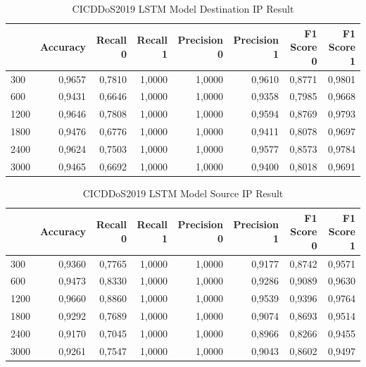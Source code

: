 \documentclass{article}
\begin{document}
\begin{table}
  \centering
  \caption{CICDDoS2019 LSTM Model Destination IP Result}
  \label{cicddos2019-lstm-dst-ip-best}
  \begin{tabular}{lrrrrrrr}
    \toprule
	{Pred Win & Accuracy & Recall 0 & Recall 1 & Precision 0 & Precision 1 & F1 Score 0 & F1 Score 1} \\
	\midrule
        300 & 0,9657 & 0,7810 & 1,0000 & 1,0000 & 0,9610 & 0,8771 & 0,9801 \\ \hline
        600 & 0,9431 & 0,6646 & 1,0000 & 1,0000 & 0,9358 & 0,7985 & 0,9668 \\ \hline
        1200 & 0,9646 & 0,7808 & 1,0000 & 1,0000 & 0,9594 & 0,8769 & 0,9793 \\ \hline
        1800 & 0,9476 & 0,6776 & 1,0000 & 1,0000 & 0,9411 & 0,8078 & 0,9697 \\ \hline
        2400 & 0,9624 & 0,7503 & 1,0000 & 1,0000 & 0,9577 & 0,8573 & 0,9784 \\ \hline
        3000 & 0,9465 & 0,6692 & 1,0000 & 1,0000 & 0,9400 & 0,8018 & 0,9691 \\ 
	\bottomrule
  \end{tabular}
\end{table}

\begin{table}
  \centering
  \caption{CICDDoS2019 LSTM Model Source IP Result}
  \label{cicddos2019-lstm-src-ip-best}
  \begin{tabular}{lrrrrrrr}
    \toprule
	{Pred Win & Accuracy & Recall 0 & Recall 1 & Precision 0 & Precision 1 & F1 Score 0 & F1 Score 1} \\
	\midrule
        300 & 0,9360 & 0,7765 & 1,0000 & 1,0000 & 0,9177 & 0,8742 & 0,9571 \\ \hline
        600 & 0,9473 & 0,8330 & 1,0000 & 1,0000 & 0,9286 & 0,9089 & 0,9630 \\ \hline
        1200 & 0,9660 & 0,8860 & 1,0000 & 1,0000 & 0,9539 & 0,9396 & 0,9764 \\ \hline
        1800 & 0,9292 & 0,7689 & 1,0000 & 1,0000 & 0,9074 & 0,8693 & 0,9514 \\ \hline
        2400 & 0,9170 & 0,7045 & 1,0000 & 1,0000 & 0,8966 & 0,8266 & 0,9455 \\ \hline
        3000 & 0,9261 & 0,7547 & 1,0000 & 1,0000 & 0,9043 & 0,8602 & 0,9497 \\ 
	\bottomrule
  \end{tabular}
\end{table}
\end{document}
